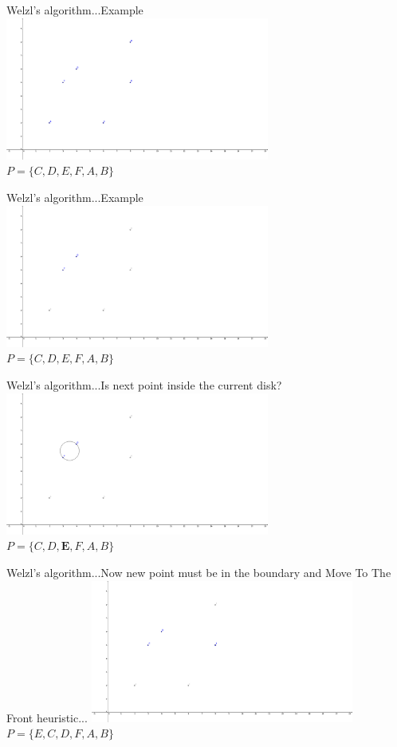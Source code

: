 \documentclass{beamer}
\begin{document}
\begin{frame}{Welzl's algorithm...}{Example}
    \centering
    \includegraphics[trim=0 0 7cm 0,clip,width=0.65\textwidth]{figures/SEC01} \\
    $P = \{C, D, E, F, A, B\}$
\end{frame}
\begin{frame}{Welzl's algorithm...}{Example}
    \centering
    \includegraphics[trim=0 0 7cm 0,clip,width=0.65\textwidth]{figures/SEC02} \\
    $P = \{C, D, E, F, A, B\}$
\end{frame}
\begin{frame}{Welzl's algorithm...}{Is next point inside the current disk?}
    \centering
    \includegraphics[trim=0 0 7cm 0,clip,width=0.65\textwidth]{figures/SEC03} \\
    $P = \{C, D, \mathbf{E}, F, A, B\}$
\end{frame}
\begin{frame}{Welzl's algorithm...}{Now new point must be in the boundary and Move To The Front heuristic...}
    \centering
    \includegraphics[trim=0 0 7cm 0,clip,width=0.65\textwidth]{figures/SEC04} \\
    $P = \{E, C, D, F, A, B\}$
\end{frame}
\end{document}
